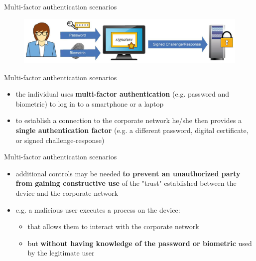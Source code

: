 \documentclass[pdf]{beamer}
\begin{document}
\begin{frame}{Multi-factor authentication scenarios}

\begin{figure}[t]
\centering
\includegraphics[scale=0.35]{Images/scenario4}
\end{figure}

\end{frame}



\begin{frame}{Multi-factor authentication scenarios}
\begin{itemize}
\item
the individual uses \textbf{multi-factor authentication} (e.g. password and biometric) to log in to a smartphone or a laptop

\item
to establish a connection to the corporate network he/she then provides a \textbf{single authentication factor} (e.g. a different password, digital certificate, or signed challenge-response)
\end{itemize}
\end{frame}



\begin{frame}{Multi-factor authentication scenarios}
\begin{itemize}
\item
additional controls may be needed \textbf{to prevent an unauthorized party from gaining constructive use} of the "trust" established between the device and the corporate network

\item
e.g. a malicious user executes a process on the device:
\begin{itemize}
\item
that allows them to interact with the corporate network
\item
but \textbf{without having knowledge of the password or biometric} used by the legitimate user
\end{itemize}
\end{itemize}
\end{frame}
\end{document}
